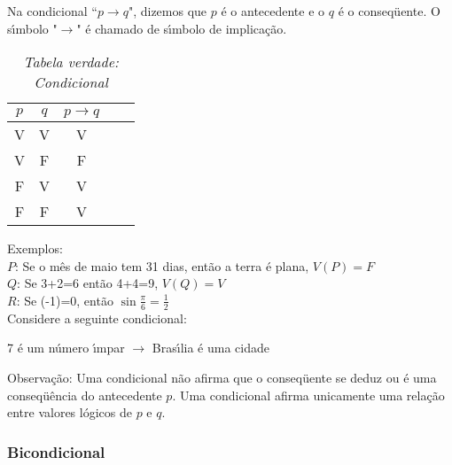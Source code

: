 Na condicional ``$p\rightarrow q$", dizemos que $p$ {\'e} o antecedente e o $q$ {\'e} o conseq{\"u}ente. O s{\'\i}mbolo "$\rightarrow$" {\'e} chamado de s{\'\i}mbolo de implica{\c c}{\~a}o.
\begin{table}[h]
   \centering 
   \setlength{\arrayrulewidth}{0,5\arrayrulewidth}
   \caption{\it Tabela verdade: Condicional}
   \begin{tabular}{|c|c|c|c|c|} 
      \hline
      $p$ & $q$ & $p\rightarrow q$ \\
     \hline
      V & V & V \\
      \hline
      V & F & F \\
      \hline
      F & V & V \\
      \hline
      F & F & V \\
      \hline
   \end{tabular}
\end{table}

Exemplos:\\
\textbf{$P$}: Se o m{\^e}s de maio tem 31 dias, ent{\~a}o a terra {\'e} plana, $V(P)=F$\\
\textbf{$Q$}: Se 3+2=6 ent{\~a}o 4+4=9, $V(Q)=V$\\
\textbf{$R$}: Se (-1)=0, ent{\~a}o $\sin\displaystyle\frac{\pi}{6}=\displaystyle\frac{1}{2}$\\

Considere a seguinte condicional:
\begin{center}
7 {\'e} um n{\'u}mero {\'\i}mpar $\rightarrow$ Bras{\'\i}lia {\'e} uma cidade
\end{center}

Observa{\c c}{\~a}o: Uma condicional n{\~a}o afirma que o conseq{\"u}ente se deduz ou {\'e} uma conseq{\"u}{\^e}ncia do antecedente $p$. Uma condicional afirma unicamente uma rela{\c c}{\~a}o entre valores l{\'o}gicos de $p$ e $q$.

\subsubsection{Bicondicional}

